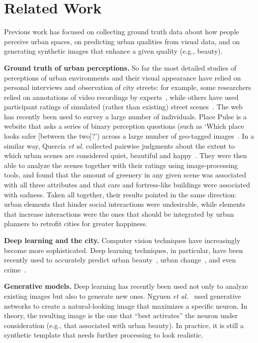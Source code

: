 \section{Related Work}
\label{sec:related}
Previous work has focused on collecting ground truth data about how people perceive urban spaces, on predicting urban qualities from visual data, and on generating synthetic images that enhance a given quality (e.g., beauty). 


\noindent
\textbf{Ground truth of urban perceptions.} So far the most detailed studies of perceptions of urban environments and their visual appearance have relied on personal interviews and observation of city streets: for example, some researchers relied on annotations of video recordings by experts~\cite{sampson04seeing}, while others have used participant ratings of simulated (rather than existing) street scenes~\cite{lindal2012}. The web has recently been used to survey a large number of individuals. Place Pulse is a website that asks a series of binary perception questions (such as `Which place looks safer [between the two]?') across a large number of geo-tagged images~\cite{salesses2013collaborative}. In a similar way, Quercia \emph{et al.} collected pairwise judgments about the extent to which urban scenes are considered quiet, beautiful and happy~\cite{quercia2014aesthetic}. They were then able to analyze the scenes together with their ratings using image-processing tools, and found that the amount of greenery in any given scene was associated with all three attributes and that cars and fortress-like buildings were associated with sadness. Taken all together, their results pointed in the same direction: urban elements that hinder social interactions were undesirable, while elements that increase interactions were the ones that should be integrated by urban planners to retrofit cities for greater happiness. 

\noindent
\textbf{Deep learning and the city.} Computer vision techniques have increasingly become more sophisticated. Deep learning techniques, in particular, have been recently used to accurately predict urban beauty~\cite{dubey2016deep,seresinhe2017using}, urban change~\cite{naik2017computer}, and even crime~\cite{DeNadai16}.

\noindent
\textbf{Generative models.} Deep learning has recently been used not only to analyze existing images but also to generate new ones. Ngyuen \emph{et al.}~\cite{nguyen2016synthesizing} used generative networks to create a natural-looking image that maximizes a specific neuron. In theory, the resulting image is the one that ``best activates'' the neuron under consideration (e.g., that associated with urban beauty). In practice, it is still a synthetic template that needs further processing to look realistic. \mbox{} \\

